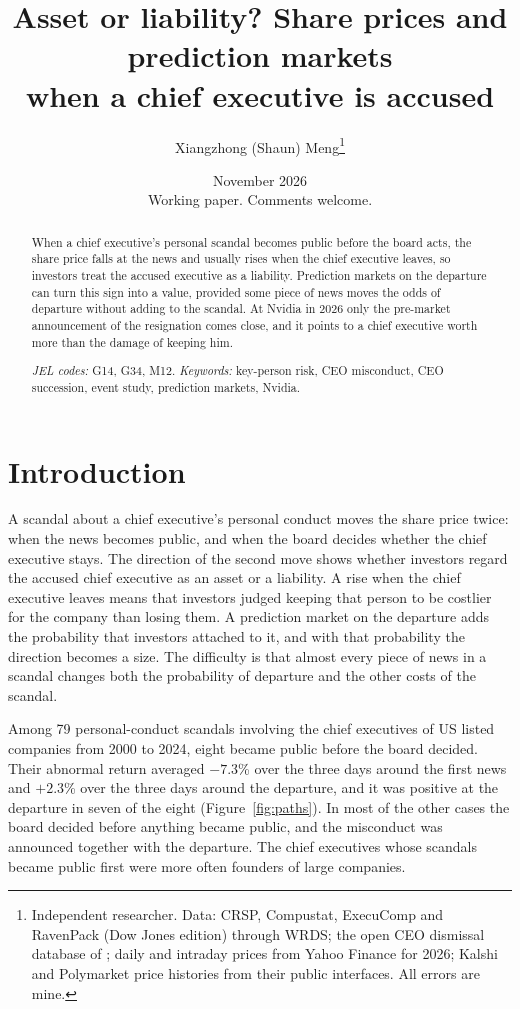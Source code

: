\documentclass[11pt,a4paper]{article}
\title{Asset or liability? Share prices and prediction markets\\ when a chief executive is accused}
\author{Xiangzhong (Shaun) Meng\thanks{Independent researcher. Data: CRSP, Compustat, ExecuComp and RavenPack (Dow Jones edition) through WRDS; the open CEO dismissal database of \citet{gentry2021}; daily and intraday prices from Yahoo Finance for 2026; Kalshi and Polymarket price histories from their public interfaces. All errors are mine.}}
\date{November 2026\\[2pt] \small Working paper. Comments welcome.}
\begin{document}
\maketitle

\begin{abstract}
\noindent When a chief executive's personal scandal becomes public before the board acts, the share price falls at the news and usually rises when the chief executive leaves, so investors treat the accused executive as a liability. Prediction markets on the departure can turn this sign into a value, provided some piece of news moves the odds of departure without adding to the scandal. At Nvidia in 2026 only the pre-market announcement of the resignation comes close, and it points to a chief executive worth more than the damage of keeping him.

\medskip\noindent\textit{JEL codes:} G14, G34, M12. \quad \textit{Keywords:} key-person risk, CEO misconduct, CEO succession, event study, prediction markets, Nvidia.
\end{abstract}

\section{Introduction}

A scandal about a chief executive's personal conduct moves the share price twice: when the news becomes public, and when the board decides whether the chief executive stays. The direction of the second move shows whether investors regard the accused chief executive as an asset or a liability. A rise when the chief executive leaves means that investors judged keeping that person to be costlier for the company than losing them. A prediction market on the departure adds the probability that investors attached to it, and with that probability the direction becomes a size. The difficulty is that almost every piece of news in a scandal changes both the probability of departure and the other costs of the scandal.

Among 79 personal-conduct scandals involving the chief executives of US listed companies from 2000 to 2024, eight became public before the board decided. Their abnormal return averaged $-7.3$\% over the three days around the first news and $+2.3$\% over the three days around the departure, and it was positive at the departure in seven of the eight (Figure~\ref{fig:paths}). In most of the other cases the board decided before anything became public, and the misconduct was announced together with the departure. The chief executives whose scandals became public first were more often founders of large companies.
\end{document}
